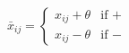 \documentclass[preview]{standalone}
\begin{document}
\begin{center}
$\bar{x}_{ij} = \begin{cases} x_{ij} + \theta & \text{if } + \\ x_{ij} - \theta & \text{if } - \end{cases}$
\end{center}
\end{document}
